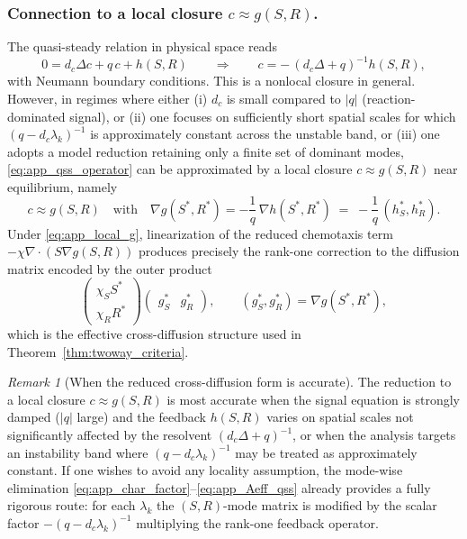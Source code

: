 \documentclass[pdflatex,sn-mathphys-ay]{sn-jnl}
\theoremstyle{thmstyleone}
\theoremstyle{definition}
\theoremstyle{remark}
\newtheorem{remark}[theorem]{Remark}
\begin{document}
\subsubsection{Connection to a local closure $c\approx g(S,R)$.}
The quasi-steady relation in physical space reads
\begin{equation}
\label{eq:app_qss_operator}
0 = d_c\Delta c + q\,c + h(S,R)
\qquad\Longrightarrow\qquad
c = -\,(d_c\Delta+q)^{-1} h(S,R),
\end{equation}
with Neumann boundary conditions. This is a nonlocal closure in general.
However, in regimes where either
(i) $d_c$ is small compared to $|q|$ (reaction-dominated signal), or
(ii) one focuses on sufficiently short spatial scales for which $(q-d_c\lambda_k)^{-1}$ is approximately constant across the
unstable band, or
(iii) one adopts a model reduction retaining only a finite set of dominant modes,
\eqref{eq:app_qss_operator} can be approximated by a local closure $c\approx g(S,R)$ near equilibrium, namely
\begin{equation}
\label{eq:app_local_g}
c \approx g(S,R)
\quad\text{with}\quad
\nabla g(S^*,R^*) = -\frac{1}{q}\,\nabla h(S^*,R^*)\;=\;-\frac{1}{q}\,(h_S^*,h_R^*).
\end{equation}
Under \eqref{eq:app_local_g}, linearization of the reduced chemotaxis term
$-\chi\nabla\cdot(S\nabla g(S,R))$ produces precisely the rank-one correction to the diffusion matrix encoded by the outer product
\[
\begin{pmatrix}\chi_S S^*\\ \chi_R R^*\end{pmatrix}
\begin{pmatrix}g_S^* & g_R^*\end{pmatrix},
\qquad
(g_S^*,g_R^*)=\nabla g(S^*,R^*),
\]
which is the effective cross-diffusion structure used in Theorem~\ref{thm:twoway_criteria}.

\begin{remark}[When the reduced cross-diffusion form is accurate]
The reduction to a local closure $c\approx g(S,R)$ is most accurate when the signal equation is strongly damped ($|q|$ large)
and the feedback $h(S,R)$ varies on spatial scales not significantly affected by the resolvent $(d_c\Delta+q)^{-1}$, or when the
analysis targets an instability band where $(q-d_c\lambda_k)^{-1}$ may be treated as approximately constant.
If one wishes to avoid any locality assumption, the mode-wise elimination \eqref{eq:app_char_factor}--\eqref{eq:app_Aeff_qss}
already provides a fully rigorous route: for each $\lambda_k$ the $(S,R)$-mode matrix is modified by the scalar factor
$-(q-d_c\lambda_k)^{-1}$ multiplying the rank-one feedback operator.
\end{remark}
\end{document}
